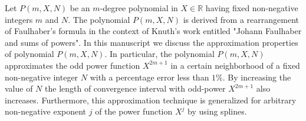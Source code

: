 Let $P(m, X, N)$ be an $m$-degree polynomial in $X\in\mathbb{R}$
having fixed non-negative integers $m$ and $N$.
The polynomial $P(m, X, N)$ is derived from a rearrangement of Faulhaber's formula
in the context of Knuth's work entitled "Johann Faulhaber and sums of powers".
In this manuscript we discuss the approximation properties of polynomial $P(m,X,N)$.
In particular, the polynomial $P(m,X,N)$ approximates the odd power function $X^{2m+1}$ in a certain neighborhood
of a fixed non-negative integer $N$ with a percentage error less than $1\%$.
By increasing the value of $N$ the length of convergence interval with odd-power $X^{2m+1}$ also increases.
Furthermore, this approximation technique is generalized for arbitrary non-negative exponent $j$ of the power function $X^j$
by using splines.
